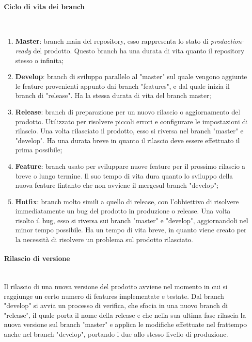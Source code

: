 \paragraph{Ciclo di vita dei branch} \-\\
\begin{enumerate}
	
	\item \textbf{Master}: branch main del repository, esso rappresenta lo stato di \textit{production-ready} del prodotto. Questo branch ha una durata di vita quanto il repository stesso o infinita;
	\item \textbf{Develop}: branch di sviluppo parallelo al "master" sul quale vengono aggiunte le feature provenienti appunto dai branch "features", e dal quale inizia il branch di "release". Ha la stessa durata di vita del branch master;
	 
	\item \textbf{Release}: branch di preparazione per un nuovo rilascio o aggiornamento del prodotto. 
	Utilizzato per risolvere piccoli errori e configurare le impostazioni di rilascio. Una volta rilasciato il 
	prodotto, esso si riversa nel branch "master" e "develop". Ha una durata breve in quanto il rilascio deve essere effettuato il prima possibile;

	\item \textbf{Feature}: branch usato per sviluppare nuove feature per il prossimo rilascio a breve o lungo termine. Il suo tempo di vita dura quanto lo sviluppo della nuova feature
	fintanto che non avviene il merge\glossario sul branch "develop";

	\item \textbf{Hotfix}: branch molto simili a quello di release, con l'obbiettivo di risolvere immediatamente un bug del prodotto in produzione o release. Una volta risolto il bug, 
	esso si riversa sui branch "master" e "develop", aggiornandoli nel minor tempo possibile. Ha un tempo di vita breve, in quanto viene creato per la necessità di risolvere 
	un problema sul prodotto rilasciato. 
	
\end{enumerate}


\paragraph{Rilascio di versione} \-\\
Il rilascio di una nuova versione del prodotto avviene nel momento in cui si raggiunge un certo numero di features implementate e testate. 
Dal branch "develop" si avvia un processo di verifica, che sfocia in una nuovo branch di "release", il quale porta il nome della release e che nella sua ultima fase rilascia la nuova versione sul branch "master" e applica le modifiche effettuate nel frattempo anche nel branch "develop", portando i due allo stesso livello di produzione. 

